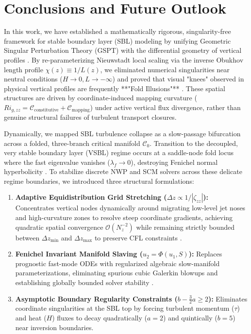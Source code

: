 \section{Conclusions and Future Outlook}
\label{sec:conclusions}

In this work, we have established a mathematically rigorous, singularity-free framework for stable boundary layer (SBL) modeling by unifying Geometric Singular Perturbation Theory (GSPT) with the differential geometry of vertical profiles \cite{nieuwstadt1984}. By re-parameterizing Nieuwstadt local scaling via the inverse Obukhov length profile $\chi(z) \equiv 1/L(z)$, we eliminated numerical singularities near neutral conditions ($H \to 0, L \to -\infty$) and proved that visual "knees" observed in physical vertical profiles are frequently **"Fold Illusions"** \cite{sheba2002}. These spatial structures are driven by coordinate-induced mapping curvature ($Ri_{g,zz} = \mathcal{C}_{\text{constitutive}} + \mathcal{C}_{\text{mapping}}$) under active vertical flux divergence, rather than genuine structural failures of turbulent transport closures.

Dynamically, we mapped SBL turbulence collapse as a slow-passage bifurcation across a folded, three-branch critical manifold $\mathcal{C}_0$. Transition to the decoupled, very stable boundary layer (VSBL) regime occurs at a saddle-node fold locus where the fast eigenvalue vanishes ($\lambda_f \to 0$), destroying Fenichel normal hyperbolicity \cite{fenichel1979}. To stabilize discrete NWP and SCM solvers across these delicate regime boundaries, we introduced three structural formulations:
\begin{enumerate}
    \item \textbf{Adaptive Equidistribution Grid Stretching ($\Delta z \propto 1/|\zeta_{zz}|$):} Concentrates vertical nodes dynamically around migrating low-level jet noses and high-curvature zones to resolve steep coordinate gradients, achieving quadratic spatial convergence $\mathcal{O}(N_z^{-2})$ while remaining strictly bounded between $\Delta z_{\text{min}}$ and $\Delta z_{\text{max}}$ to preserve CFL constraints \cite{gabls3_2013}.
    \item \textbf{Fenichel Invariant Manifold Slaving ($u_2 = \Phi(u_1, S)$):} Replaces prognostic fast-mode ODEs with regularized algebraic slow-manifold parameterizations, eliminating spurious cubic Galerkin blowups and establishing globally bounded solver stability \cite{fenichel1979}.
    \item \textbf{Asymptotic Boundary Regularity Constraints ($b - \frac{3}{2}a \ge 2$):} Eliminates coordinate singularities at the SBL top by forcing turbulent momentum ($\tau$) and heat ($H$) fluxes to decay quadratically ($a=2$) and quintically ($b=5$) near inversion boundaries.
\end{enumerate}

